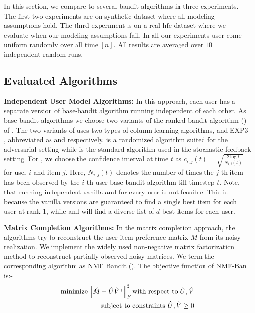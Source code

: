 In this section, we compare \latentranker to several bandit algorithms in three experiments. The first two experiments are on synthetic dataset where all modeling assumptions hold. The third experiment is on a real-life dataset where we evaluate \latentranker when our modeling assumptions fail. In all our experiments user come uniform randomly over all time $[n]$. All results are averaged over $10$ independent random runs.

\subsection{Evaluated Algorithms}
\textbf{Independent User Model Algorithms:} In this approach, each user has a separate version of base-bandit algorithm running independent of each other. As base-bandit algorithms we choose two variants of the ranked bandit algorithm (\RBA) of \citet{radlinski2008learning}. The two variants of \RBA uses two types of column learning algorithms, \ucb \citep{auer2002finite} and EXP3 \citep{auer2002nonstochastic}, abbreviated as \RBAUCB  and \RBAEXP respectively. \expthree is a randomized algorithm suited for the adversarial setting while \ucb is the standard algorithm used in the stochastic feedback setting. For \RBAUCB, we choose the confidence interval at time $t$ as $c_{i, j}(t) = \sqrt{\frac{ 2\log t}{N_{i, j}(t)}}$ for user $i$ and item $j$. Here, $N_{i, j}(t)$ denotes the number of times the $j$-th item has been observed by the $i$-th user base-bandit algorithm till timestep $t$. Note, that running independent vanilla \ucb and \expthree for every user is not feasible. This is because the vanilla versions are guaranteed to find a single best item for each user at rank $1$, while \RBAUCB and \RBAEXP will find a diverse list of $d$ best items for each user.



\textbf{Matrix Completion Algorithms:} In the matrix completion approach, the algorithms try to reconstruct the user-item preference matrix $M$ from its noisy realization. We implement the widely used non-negative matrix factorization method to reconstruct partially observed noisy matrices. We term the corresponding algorithm as NMF Bandit (\NMFBan). The objective function of NMF-Ban is:-
\begin{align*}
\text{minimize} \left\lVert\hat{M} - \hat{U}\hat{V}^\intercal\right\rVert_{F}^{2} \text{with respect to $\hat{U}, \hat{V}$}\\
\text{ subject to constraints } \hat{U}, \hat{V} \geq 0
\end{align*}

